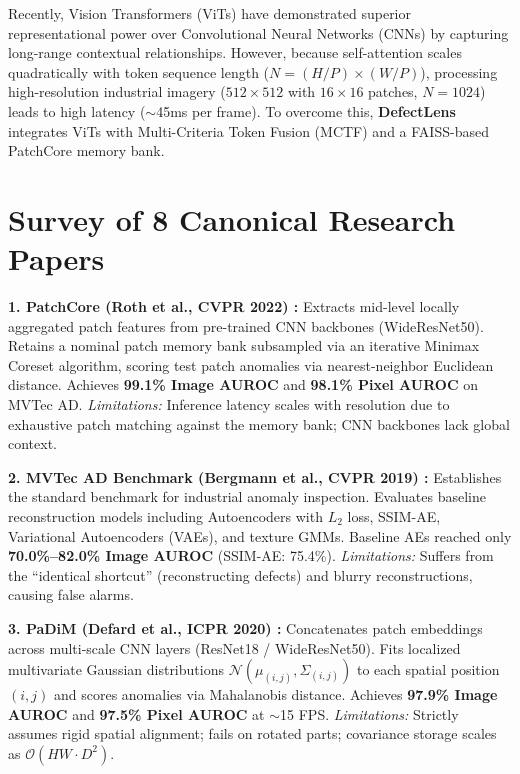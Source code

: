\documentclass[10pt,journal,compsoc]{IEEEtran}
\begin{document}
Recently, Vision Transformers (ViTs) have demonstrated superior representational power over Convolutional Neural Networks (CNNs) by capturing long-range contextual relationships. However, because self-attention scales quadratically with token sequence length ($N = (H/P) \times (W/P)$), processing high-resolution industrial imagery ($512\times512$ with $16\times16$ patches, $N = 1024$) leads to high latency ($\sim$45ms per frame). To overcome this, \textbf{DefectLens} integrates ViTs with Multi-Criteria Token Fusion (MCTF) and a FAISS-based PatchCore memory bank.

\section{Survey of 8 Canonical Research Papers}

\noindent \textbf{1. PatchCore (Roth et al., CVPR 2022) \cite{roth2022patchcore}:} Extracts mid-level locally aggregated patch features from pre-trained CNN backbones (WideResNet50). Retains a nominal patch memory bank subsampled via an iterative Minimax Coreset algorithm, scoring test patch anomalies via nearest-neighbor Euclidean distance. Achieves \textbf{99.1\% Image AUROC} and \textbf{98.1\% Pixel AUROC} on MVTec AD. \textit{Limitations:} Inference latency scales with resolution due to exhaustive patch matching against the memory bank; CNN backbones lack global context.

\noindent \textbf{2. MVTec AD Benchmark (Bergmann et al., CVPR 2019) \cite{bergmann2019mvtec}:} Establishes the standard benchmark for industrial anomaly inspection. Evaluates baseline reconstruction models including Autoencoders with $L_2$ loss, SSIM-AE, Variational Autoencoders (VAEs), and texture GMMs. Baseline AEs reached only \textbf{70.0\%--82.0\% Image AUROC} (SSIM-AE: 75.4\%). \textit{Limitations:} Suffers from the ``identical shortcut'' (reconstructing defects) and blurry reconstructions, causing false alarms.

\noindent \textbf{3. PaDiM (Defard et al., ICPR 2020) \cite{defard2020padim}:} Concatenates patch embeddings across multi-scale CNN layers (ResNet18 / WideResNet50). Fits localized multivariate Gaussian distributions $\mathcal{N}(\mu_{(i,j)}, \Sigma_{(i,j)})$ to each spatial position $(i, j)$ and scores anomalies via Mahalanobis distance. Achieves \textbf{97.9\% Image AUROC} and \textbf{97.5\% Pixel AUROC} at $\sim$15 FPS. \textit{Limitations:} Strictly assumes rigid spatial alignment; fails on rotated parts; covariance storage scales as $\mathcal{O}(HW \cdot D^2)$.
\end{document}
